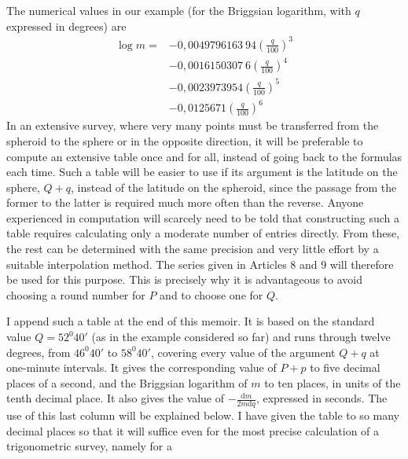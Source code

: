 \par\indent The numerical values in our example (for the Briggsian logarithm, with \(q\) expressed in degrees) are
\[
\begin{aligned}
\log m={}&-0{,}0049796163\ 94(\frac{q}{100})^3\\
&-0{,}0016150307\ 6(\frac{q}{100})^4\\
&-0{,}0023973954(\frac{q}{100})^5\\
&-0{,}0125671(\frac{q}{100})^6
\end{aligned}
\]
\indent In an extensive survey, where very many points must be transferred from the spheroid to the sphere or in the opposite direction, it will be preferable to compute an extensive table once and for all, instead of going back to the formulas each time. Such a table will be easier to use if its argument is the latitude on the sphere, \(Q+q\), instead of the latitude on the spheroid, since the passage from the former to the latter is required much more often than the reverse. Anyone experienced in computation will scarcely need to be told that constructing such a table requires calculating only a moderate number of entries directly. From these, the rest can be determined with the same precision and very little effort by a suitable interpolation method. The series given in Articles 8 and 9 will therefore be used for this purpose. This is precisely why it is advantageous to avoid choosing a round number for \(P\) and to choose one for \(Q\).

I append such a table at the end of this memoir. It is based on the standard value \(Q=52^0 40'\) (as in the example considered so far) and runs through twelve degrees, from \(46^0 40'\) to \(58^0 40'\), covering every value of the argument \(Q+q\) at one-minute intervals. It gives the corresponding value of \(P+p\) to five decimal places of a second, and the Briggsian logarithm of \(m\) to ten places, in units of the tenth decimal place. It also gives the value of \(-\tfrac{\mathrm{d}m}{2m\mathrm{d}q}\), expressed in seconds. The use of this last column will be explained below. I have given the table to so many decimal places so that it will suffice even for the most precise calculation of a trigonometric survey, namely for a
